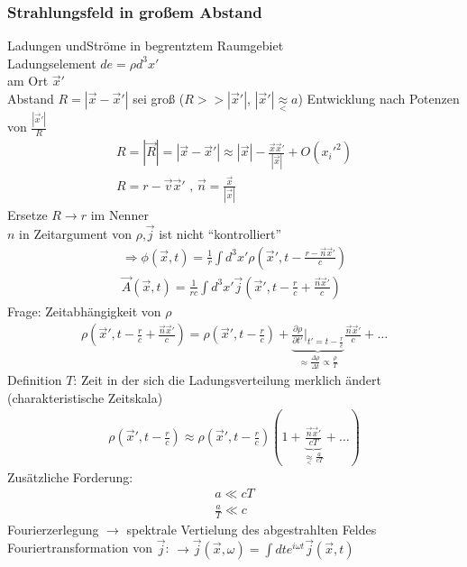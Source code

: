 \documentclass[a4paper]{article}
\begin{document}
\subsubsection{Strahlungsfeld in großem Abstand}
Ladungen undStröme in begrentztem Raumgebiet\\
Ladungselement $de=\rho d^3x'$\\ am Ort $\vec{x}'$\\
Abstand $R=|\vec{x}-\vec{x}'|$ sei groß ($R>>|\vec{x}'|$,
$|\vec{x}'|\underset{<}{\approx}a$)
Entwicklung nach Potenzen von $\frac{|\vec{x}'|}{R}$
\begin{align}
R=|\vec{R}|=|\vec{x}-\vec{x}'|\approx
|\vec{x}|-\frac{\vec{x}\vec{x}'}{|\vec{x}|}+O({x_i'}^2)\\
R=r-\vec{v}\vec{x}' \text{ , }\vec{n}=\frac{\vec{x}}{|\vec{x}|}
\end{align}
Ersetze $R\rightarrow r$ im Nenner\\
$n$ in Zeitargument von $\rho$,$\vec{j}$ ist nicht "`kontrolliert"'
\begin{align}
\Rightarrow \phi(\vec{x},t)=\frac{1}{r}\int d^3x'
\rho(\vec{x}',t-\frac{r-\vec{n}\vec{x}'}{c})\\
\vec{A}(\vec{x},t)=\frac{1}{rc}\int d^3x'
\vec{j}(\vec{x}',t-\frac{r}{c}+\frac{\vec{n}\vec{x}'}{c})
\end{align}
Frage: Zeitabhängigkeit von $\rho$\\
\begin{align}
\rho(\vec{x}',t-\frac{r}{c}+\frac{\vec{n}\vec{x}'}{c})=
\rho(\vec{x}',t-\frac{r}{c})+\underbrace{\frac{\partial \rho}{\partial
t'}|_{t'=t-\frac{r}{c}}}_{\approx\frac{\Delta
\rho}{\Delta t}\propto \frac{\rho}{T}}\frac{\vec{n}\vec{x}'}{c}+\ldots
\end{align}
Definition $T$: Zeit in der sich die Ladungsverteilung merklich ändert
(charakteristische Zeitskala)
\begin{align}
\rho(\vec{x}',t-\frac{r}{c})\approx \rho(\vec{x}',t-\frac{r}{c})\left(1+
\underbrace{\frac{\vec{n}\vec{x}'}{c T}}_{\underset{<}{\approx}\frac{a}{cT}}+\ldots
\right)
\end{align}
Zusätzliche Forderung: 
\begin{align}
a \ll cT \\
\frac{a}{T} \ll c
\end{align}
Fourierzerlegung $\rightarrow$ spektrale Vertielung des abgestrahlten Feldes\\
Fouriertransformation von $\vec{j}$: $\rightarrow
\vec{j}(\vec{x},\omega)=\int dt e^{i\omega t} \vec{j}(\vec{x},t)$
\end{document}
